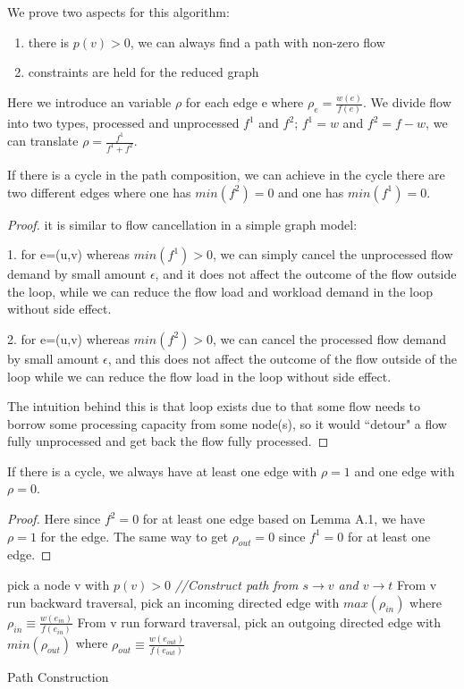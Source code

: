 We prove two aspects for this algorithm: 
\begin{enumerate}
  \item {there is $p(v) >0$, we can always find a path with non-zero flow}
   \item {constraints are held for the reduced graph} 
\newline
\end{enumerate}
Here we introduce an variable $\rho$ for each edge e where $\rho_{e} = \frac{ w(e)}{f(e)}$. We divide flow into two types, processed and unprocessed $f^1$ and $f^2$; $f^1=w$ and $f^2=f-w$, we can translate $\rho = \frac{ f^1} {f^1+f^2 }$.

\begin{lemma} If there is a cycle in the path composition, we can achieve in the cycle there are two different edges where one has $min(f^2) = 0$ and one has $min(f^1)=0$. 
\end{lemma} 
\begin{proof} it is similar to flow cancellation in a simple graph model: 

1. for e=(u,v) whereas $min(f^1) >0$, we can simply cancel the unprocessed flow demand by small amount $\epsilon$, and it does not affect the outcome of the flow outside the loop, while we can reduce the flow load and workload demand in the loop without side effect. 

2. for e=(u,v) whereas $min(f^2)>0$, we can cancel the processed flow demand by small amount $\epsilon$, and this does not affect the outcome of the flow outside of the loop while we can reduce the flow load in the loop without side effect. 

The intuition behind this is that loop exists due to that some flow needs to borrow some processing capacity from some node(s), so it would ``detour" a flow fully unprocessed and get back the flow fully processed. 
\end{proof}

\begin{lemma}
If there is a cycle, we always have at least one edge with $\rho =1$ and one edge with $\rho =0$.
\end{lemma}
\begin{proof}
 Here since $f^2=0$ for at least one edge based on Lemma A.1, we have $\rho=1$ for the edge. The same way to get $\rho_{out}=0$ since $f^1=0$ for at least one edge. 
\end{proof}
\begin{algorithm}  \label{path construction}
\SetAlgoLined
\BlankLine
pick a node v with $p(v)>0$\;
\emph{//Construct path from $s\rightarrow v$ and $v\rightarrow t$}\;
From v run backward traversal, pick an incoming directed edge with $ max( \rho_{in} )  $ where $\rho_{in} \equiv \frac{ w(e_{in})}{f(e_{in})}$\;
From v run forward traversal, pick an outgoing directed edge with $ min(\rho_{out} ) $ where $\rho_{out} \equiv \frac{ w(e_{out})}{f(e_{out})} $\;
\caption{Path Construction}
\end{algorithm}


